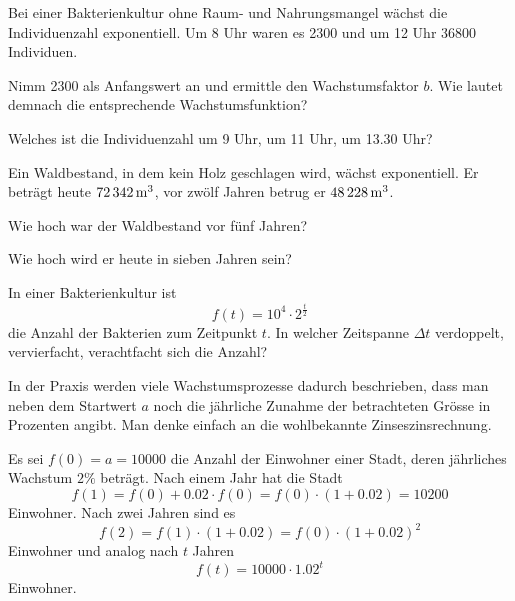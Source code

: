 \documentclass[%
11pt,%
twoside,%
titlepage,%
german,%
headsepline%
]{scrartcl}
\begin{document}
\begin{ueb}[Bakterien]
Bei einer Bakterienkultur ohne Raum- und Nahrungsmangel wächst die Individuenzahl exponentiell. Um 8 Uhr waren es 2300 und um 12 Uhr 36800 Individuen.
\begin{enumeratea}
\item Nimm 2300 als Anfangswert an und ermittle den Wachstumsfaktor $b$. Wie lautet demnach die entsprechende Wachstumsfunktion?
\item Welches ist die Individuenzahl um 9 Uhr, um 11 Uhr, um 13.30 Uhr?\label{bakterienb}
\end{enumeratea}
\end{ueb}

\begin{ueb}[Wald]
Ein Waldbestand, in dem kein Holz geschlagen wird, wächst exponentiell. Er beträgt heute $\unit[72\,342]{m^3}$, vor zwölf Jahren betrug er $\unit[48\,228]{m^3}$.
\begin{enumeratea}
\item Wie hoch war der Waldbestand vor fünf Jahren?
\item Wie hoch wird er heute in sieben Jahren sein?
\end{enumeratea}
\end{ueb}

\begin{ueb}[Bakterienkultur]
In einer Bakterienkultur ist $$f(t) =10^4 \cdot 2^\frac{t}{2}$$ die Anzahl der Bakterien zum Zeitpunkt $t$. In welcher Zeitspanne $\Delta t$ verdoppelt, vervierfacht, verachtfacht sich die Anzahl?
\end{ueb}

\begin{bem}
In der Praxis werden viele Wachstumsprozesse dadurch beschrieben, dass man neben dem Startwert $a$ noch die jährliche Zunahme der betrachteten Grösse in Prozenten angibt. Man denke einfach an die wohlbekannte Zinseszinsrechnung.
\end{bem}

\begin{bsp}
Es sei $f(0)=a=10000$ die Anzahl der Einwohner einer Stadt, deren jährliches Wachstum $2\%$ beträgt. Nach einem Jahr hat die Stadt $$f(1)=f(0)+0.02\cdot f(0)=f(0)\cdot(1+0.02)=10200$$ Einwohner. Nach zwei Jahren sind es
$$f(2)=f(1)\cdot(1+0.02)=f(0)\cdot(1+0.02)^2$$ Einwohner und analog nach $t$ Jahren
$$f(t)=10000\cdot1.02^t$$ Einwohner.
\end{bsp}
\end{document}
